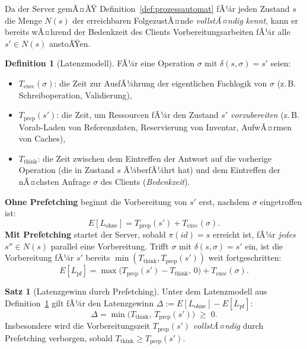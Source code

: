 ﻿\documentclass[a4paper,12pt]{article}
\theoremstyle{definition}
\newtheorem{definition}{Definition}
\newtheorem{satz}{Satz}
\begin{document}
Da der Server gemÃ¤ÃŸ Definition~\ref{def:prozessautomat} fÃ¼r jeden Zustand $s$ die Menge
$N(s)$ der erreichbaren FolgezustÃ¤nde \emph{vollstÃ¤ndig kennt}, kann er bereits wÃ¤hrend
der Bedenkzeit des Clients Vorbereitungsarbeiten fÃ¼r alle $s' \in N(s)$ anstoÃŸen.

\begin{definition}[Latenzmodell]
	\label{def:latenzmodell}
	FÃ¼r eine Operation $\sigma$ mit $\delta(s,\sigma)=s'$ seien:
	\begin{itemize}
		\item $T_{\mathrm{exec}}(\sigma)$: die Zeit zur AusfÃ¼hrung der eigentlichen
		      Fachlogik von $\sigma$ (z.\,B. Schreiboperation, Validierung),
		\item $T_{\mathrm{prep}}(s')$: die Zeit, um Ressourcen fÃ¼r den Zustand $s'$
		      \emph{vorzubereiten} (z.\,B. Vorab-Laden von Referenzdaten, Reservierung von
		      Inventar, AufwÃ¤rmen von Caches),
		\item $T_{\mathrm{think}}$: die Zeit zwischen dem Eintreffen der Antwort auf die
		      vorherige Operation (die in Zustand $s$ Ã¼berfÃ¼hrt hat) und dem Eintreffen
		      der nÃ¤chsten Anfrage $\sigma$ des Clients (\emph{Bedenkzeit}).
	\end{itemize}
	\textbf{Ohne Prefetching} beginnt die Vorbereitung von $s'$ erst, nachdem $\sigma$
	eingetroffen ist:
	\[
		E[L_{\text{ohne}}] = T_{\mathrm{prep}}(s') + T_{\mathrm{exec}}(\sigma).
	\]
	\textbf{Mit Prefetching} startet der Server, sobald $\pi(id)=s$ erreicht ist, fÃ¼r
	\emph{jedes} $s'' \in N(s)$ parallel eine Vorbereitung. Trifft $\sigma$ mit
	$\delta(s,\sigma)=s'$ ein, ist die Vorbereitung fÃ¼r $s'$ bereits
	$\min(T_{\mathrm{think}}, T_{\mathrm{prep}}(s'))$ weit fortgeschritten:
	\[
		E[L_{\mathrm{pf}}] = \max\bigl(T_{\mathrm{prep}}(s') - T_{\mathrm{think}},\, 0\bigr)
		+ T_{\mathrm{exec}}(\sigma).
	\]
\end{definition}

\begin{satz}[Latenzgewinn durch Prefetching]
	\label{satz:latenzgewinn}
	Unter dem Latenzmodell aus Definition~\ref{def:latenzmodell} gilt fÃ¼r den
	Latenzgewinn $\Delta := E[L_{\text{ohne}}] - E[L_{\mathrm{pf}}]$:
	\[
		\Delta = \min\bigl(T_{\mathrm{think}},\, T_{\mathrm{prep}}(s')\bigr) \;\geq\; 0.
	\]
	Insbesondere wird die Vorbereitungszeit $T_{\mathrm{prep}}(s')$ \emph{vollstÃ¤ndig}
	durch Prefetching verborgen, sobald $T_{\mathrm{think}} \geq T_{\mathrm{prep}}(s')$.
\end{satz}
\end{document}
